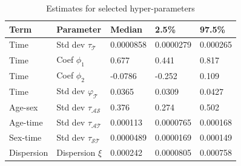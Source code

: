 \begin{table}[ht]
\centering
\caption{Estimates for selected hyper-parameters} 
\label{tab:hyper}
\begin{tabular}{lllll}
  \hline
Term & Parameter & Median & 2.5\% & 97.5\% \\ 
  \hline
Time & Std dev $\tau_{\mathcal{T}}$ & 0.0000858 & 0.0000279 & 0.000265 \\ 
  Time & Coef $\phi_1$ & 0.677 & 0.441 & 0.817 \\ 
  Time & Coef $\phi_2$ & -0.0786 & -0.252 & 0.109 \\ 
  Time & Std dev $\varphi_{\mathcal{T}}$ & 0.0365 & 0.0309 & 0.0427 \\ 
  Age-sex & Std dev $\tau_{\mathcal{AS}}$ & 0.376 & 0.274 & 0.502 \\ 
  Age-time & Std dev $\tau_{\mathcal{AT}}$ & 0.000113 & 0.0000765 & 0.000168 \\ 
  Sex-time & Std dev $\tau_{\mathcal{ST}}$ & 0.0000489 & 0.0000169 & 0.000149 \\ 
  Dispersion & Dispersion $\xi$ & 0.000242 & 0.0000805 & 0.000758 \\ 
   \hline
\end{tabular}
\end{table}
